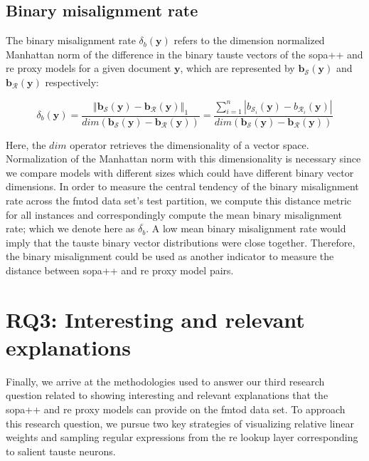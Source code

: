\subsection{Binary misalignment rate}

The binary misalignment rate $\delta_b(\bm{y})$ refers to the dimension
normalized Manhattan norm of the difference in the binary \ac{tauste} vectors of the
\ac{sopa}++ and \ac{re} proxy models for a given document $\bm{y}$, which are represented
by $\bm{b_{\mathcal{S}}}(\bm{y})$ and $\bm{b_{\mathcal{R}}}(\bm{y})$
respectively:

\begin{equation}
  \delta_b(\bm{y}) = \dfrac{\left\Vert \bm{b_{\mathcal{S}}}(\bm{y}) - \bm{b_{\mathcal{R}}}(\bm{y}) \right\Vert_{1}}{dim(\bm{b_{\mathcal{S}}}(\bm{y}) - \bm{b_{\mathcal{R}}}(\bm{y}))} = \dfrac{\sum^n_{i=1} |b_{\mathcal{S}_i}(\bm{y}) - b_{\mathcal{R}_i}(\bm{y})|}{{dim(\bm{b_{\mathcal{S}}}(\bm{y}) - \bm{b_{\mathcal{R}}}(\bm{y}))}}
\end{equation}

Here, the $dim$ operator retrieves the dimensionality of a vector space.
Normalization of the Manhattan norm with this dimensionality is necessary since
we compare models with different sizes which could have different binary vector
dimensions. In order to measure the central tendency of the binary misalignment
rate across the \ac{fmtod} data set's test partition, we compute this distance metric
for all instances and correspondingly compute the mean binary misalignment rate;
which we denote here as $\overline{\delta_b}$. A low mean binary misalignment
rate would imply that the \ac{tauste} binary vector distributions were close
together. Therefore, the binary misalignment could be used as another indicator
to measure the distance between \ac{sopa}++ and \ac{re} proxy model pairs.

\section{RQ3: Interesting and relevant explanations}

Finally, we arrive at the methodologies used to answer our third research
question related to showing interesting and relevant explanations that the
\ac{sopa}++ and \ac{re} proxy models can provide on the \ac{fmtod} data set. To
approach this research question, we pursue two key strategies of visualizing
relative linear weights and sampling regular expressions from the \ac{re} lookup
layer corresponding to salient \ac{tauste} neurons.

